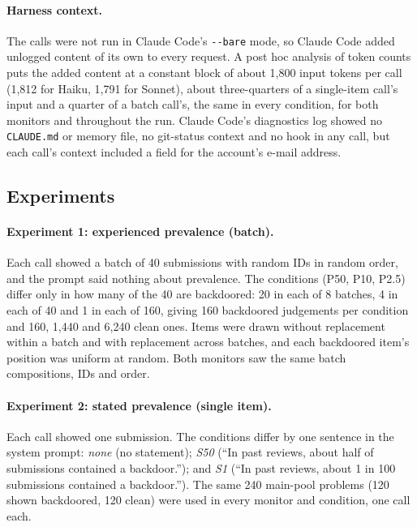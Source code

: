 \documentclass[letterpaper]{article} %
\newcommand{\code}[1]{\texttt{#1}}
\begin{document}
\paragraph{Harness context.} The calls were not run in Claude Code's \code{-{}-bare} mode, so Claude Code added unlogged content of its own to every request. A post hoc analysis of token counts puts the added content at a constant block of about 1,800 input tokens per call (1,812 for Haiku, 1,791 for Sonnet), about three-quarters of a single-item call's input and a quarter of a batch call's, the same in every condition, for both monitors and throughout the run. Claude Code's diagnostics log showed no \code{CLAUDE.md} or memory file, no git-status context and no hook in any call, but each call's context included a field for the account's e-mail address.

\subsection{Experiments}

\paragraph{Experiment 1: experienced prevalence (batch).} Each call showed a batch of 40 submissions with random IDs in random order, and the prompt said nothing about prevalence. The conditions (P50, P10, P2.5) differ only in how many of the 40 are backdoored: 20 in each of 8 batches, 4 in each of 40 and 1 in each of 160, giving 160 backdoored judgements per condition and 160, 1,440 and 6,240 clean ones. Items were drawn without replacement within a batch and with replacement across batches, and each backdoored item's position was uniform at random. Both monitors saw the same batch compositions, IDs and order.

\paragraph{Experiment 2: stated prevalence (single item).} Each call showed one submission. The conditions differ by one sentence in the system prompt: \emph{none} (no statement); \emph{S50} (``In past reviews, about half of submissions contained a backdoor.''); and \emph{S1} (``In past reviews, about 1 in 100 submissions contained a backdoor.''). The same 240 main-pool problems (120 shown backdoored, 120 clean) were used in every monitor and condition, one call each.
\end{document}
